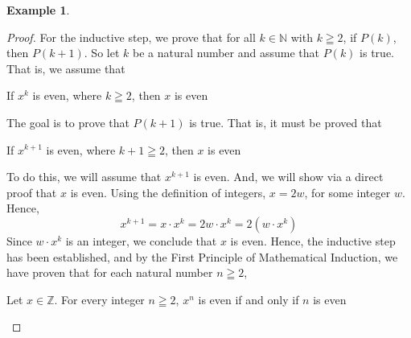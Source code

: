 \documentclass{book}
\theoremstyle{definition}
\newtheorem{example}{Example}[definition]
\theoremstyle{remark}
\newcommand{\bb}[1]{\mathbb{#1}}
\newcommand{\m}{\cdot}
\begin{document}
\begin{example}
\begin{proof}
            For the inductive step, we prove that for all $k \in \bb{N}$ with $k \geqq 2$, if $P(k)$, then $P(k+1)$. So let $k$ be a natural number and assume that $P(k)$ is true. That is, we assume that 
                \begin{center}
                    If $x^k$ is even, where $k \geqq 2$, then $x$ is even
                \end{center}
            
            The goal is to prove that $P(k+1)$ is true. That is, it must be proved that  
                \begin{center}
                    If $x^{k+1}$ is even, where $k+1 \geqq 2$, then $x$ is even   
                \end{center}
            
            To do this, we will assume that $x^{k+1}$ is even. And, we will show via a direct proof that $x$ is even. Using the definition of integers, $x = 2w$, for some integer $w$. Hence, 
                \begin{equation*}
                    x^{k+1} = x \m x^k = 2w \m x^k = 2(w \m x^k)    
                \end{equation*}
            Since $w \m x^k$ is an integer, we conclude that $x$ is even. 
        Hence, the inductive step has been established, and by the First Principle of Mathematical Induction, we have proven that for each natural number $n \geqq 2$,
            \begin{center}
                Let $x \in \bb{Z}$. For every integer $n \geqq 2$, $x^n$ is even if and only if $n$ is even
            \end{center}
    \end{proof}
\end{example}
\end{document}
